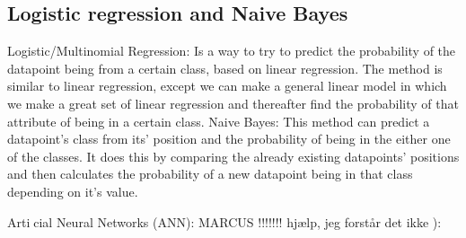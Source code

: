 \subsection{Logistic regression and Naive Bayes}
Logistic/Multinomial Regression:
Is a way to try to predict the probability of the datapoint being from a certain class,
based on linear regression.
The method is similar to linear regression, except we can make a general linear model in which we make a great set of linear regression
and thereafter find the probability of that attribute of being in a certain class.
Naive Bayes:
This method can predict a datapoint's class from its' position and the probability
of being in the either one of the classes. It does this by comparing the already existing
datapoints' positions and then calculates the probability of a new datapoint being in that
class depending on it's value.


Articial Neural Networks (ANN):
MARCUS !!!!!!! hjælp, jeg forstår det ikke ):




